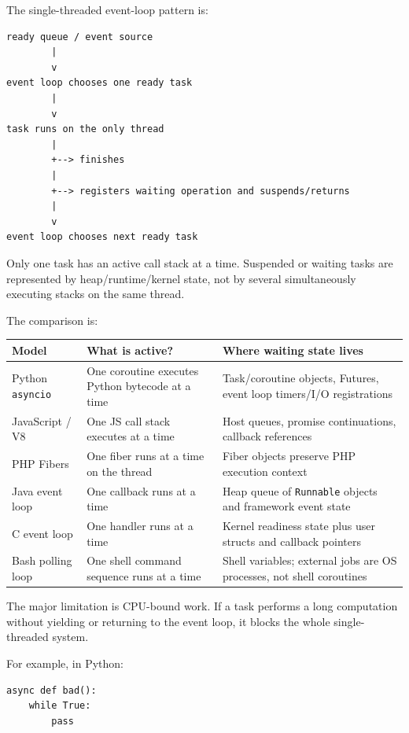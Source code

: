 The single-threaded event-loop pattern is:

\begin{verbatim}
ready queue / event source
        |
        v
event loop chooses one ready task
        |
        v
task runs on the only thread
        |
        +--> finishes
        |
        +--> registers waiting operation and suspends/returns
        |
        v
event loop chooses next ready task
\end{verbatim}

Only one task has an active call stack at a time. Suspended or waiting tasks are represented by heap/runtime/kernel state, not by several simultaneously executing stacks on the same thread.

The comparison is:

\begin{center}
\begin{tabular}{|p{}|p{}|p{}|}
\hline
\textbf{Model} & \textbf{What is active?} & \textbf{Where waiting state lives} \\
\hline
Python \texttt{asyncio} & One coroutine executes Python bytecode at a time & Task/coroutine objects, Futures, event loop timers/I/O registrations \\
\hline
JavaScript / V8 & One JS call stack executes at a time & Host queues, promise continuations, callback references \\
\hline
PHP Fibers & One fiber runs at a time on the thread & Fiber objects preserve PHP execution context \\
\hline
Java event loop & One callback runs at a time & Heap queue of \texttt{Runnable} objects and framework event state \\
\hline
C event loop & One handler runs at a time & Kernel readiness state plus user structs and callback pointers \\
\hline
Bash polling loop & One shell command sequence runs at a time & Shell variables; external jobs are OS processes, not shell coroutines \\
\hline
\end{tabular}
\end{center}

The major limitation is CPU-bound work. If a task performs a long computation without yielding or returning to the event loop, it blocks the whole single-threaded system.

For example, in Python:

\begin{verbatim}
async def bad():
    while True:
        pass
\end{verbatim}

